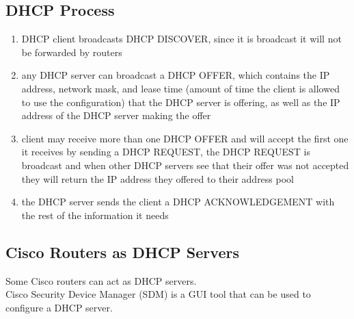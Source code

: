 \documentclass{article}
\begin{document}
\subsection{DHCP Process}

\begin{enumerate}

\item DHCP client broadcasts DHCP DISCOVER, since it is broadcast it will not
be forwarded by routers

\item any DHCP server can broadcast a DHCP OFFER, which contains the IP
address, network mask, and lease time (amount of time the client is allowed to
use the configuration) that the DHCP server is offering, as well as the IP
address of the DHCP server making the offer

\item client may receive more than one DHCP OFFER and will accept the first
one it receives by sending a DHCP REQUEST, the DHCP REQUEST is broadcast and
when other DHCP servers see that their offer was not accepted they will
return the IP address they offered to their address pool

\item the DHCP server sends the client a DHCP ACKNOWLEDGEMENT with the rest of
the information it needs

\end{enumerate}

\subsection{Cisco Routers as DHCP Servers}

Some Cisco routers can act as DHCP servers.\\

Cisco Security Device Manager (SDM) is a GUI tool that can be used to
configure a DHCP server.
\end{document}
